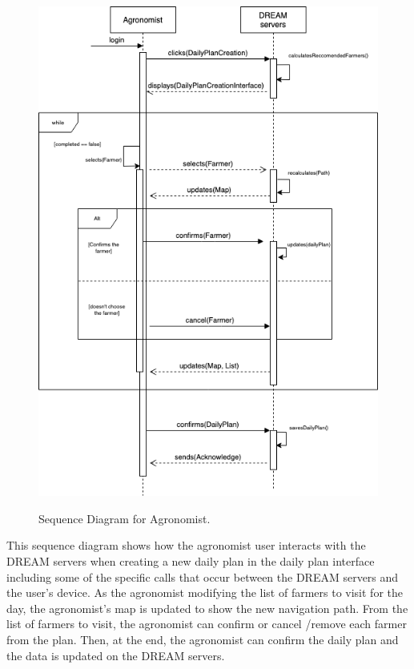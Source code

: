 \begin{figure}[hbt!]
\centering
\includegraphics[scale=0.6]{Files/sequence_disgrams/thePNGs/agronomist_createPlan.png}\\
\caption{\label{fig:agrSeqCreatePlan}Sequence Diagram for Agronomist.}
\end{figure}
\begin{flushleft}
This sequence diagram shows how the agronomist user interacts with the DREAM servers when creating a new daily plan in the daily plan interface including some of the specific calls that occur between the DREAM servers and the user's device. As the agronomist modifying the list of farmers to visit for the day, the agronomist's map is updated to show the new navigation path. From the list of farmers to visit, the agronomist can confirm or cancel /remove each farmer from the plan. Then, at the end, the agronomist can confirm the daily plan and the data is updated on the DREAM servers. 
\end{flushleft}

